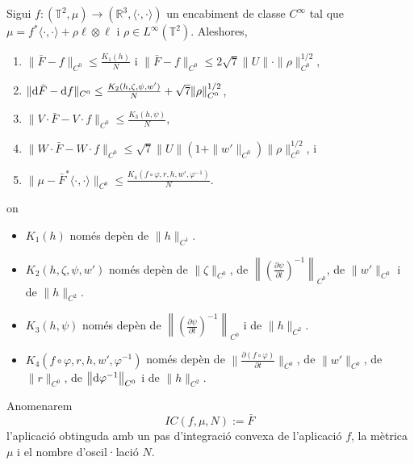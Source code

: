 \begin{teo}\label{teo:OneStep}
    Sigui $f:(\mathbb T^2, \mu)\to(\mathbb R^3, \langle\cdot, \cdot\rangle)$ un encabiment de classe $C^\infty$ tal que $\mu = f^*\langle\cdot, \cdot\rangle + \rho\ell\otimes\ell$ i $\rho\in L^\infty(\mathbb T^2)$. Aleshores, 
    \begin{enumerate}
        \item $\|\bar F-f\|_{C^0}\le\frac{K_1(h)}{N}$ i $\|\bar F-f\|_{C^0}\le 2\sqrt7\|U\|\cdot\|\rho\|^{1/2}_{C^0}$,
        \item $\|\text d\bar F-\text df\|_{C^0}\le\frac{K_2(h,\zeta,\psi,w')}{N} + \sqrt7\|\rho\|^{1/2}_{C^0}$,
        \item $\|V\cdot\bar F-V\cdot f\|_{C^0}\le\frac{K_3(h,\psi)}{N}$,
        \item $\|W\cdot\bar F-W\cdot f\|_{C^0}\le\sqrt7\|U\|(1+\|w'\|_{C^0})\|\rho\|^{1/2}_{C^0}$, i
        \item $\|\mu - \bar F^*\langle\cdot, \cdot\rangle\|_{C^0}\le\frac{K_4(f\circ\varphi,r,h,w',\varphi^{-1})}{N}$.
    \end{enumerate}
    on 
    \begin{itemize}
        \item $K_1(h)$ només depèn de $\|h\|_{C^1}$.
        \item $K_2(h,\zeta,\psi,w')$ només depèn de $\|\zeta\|_{C^0}$, de $\left\|\left(  \frac{\partial\psi}{\partial t}\right)^{-1}\right\|_{C^0}$, de $\|w'\|_{C^0}$ i de $\|h\|_{C^2}$.
        \item $K_3(h,\psi)$ només depèn de $\left\|\left(  \frac{\partial\psi}{\partial t}\right)^{-1}\right\|_{C^0}$ i de $\|h\|_{C^2}$.
        \item $K_4(f\circ\varphi,r,h,w',\varphi^{-1})$ només depèn de $\|\frac{\partial(f\circ\varphi)}{\partial t}\|_{C^0}$, de $\|w'\|_{C^0}$, de $\|r\|_{C^0}$, de $\left\|\text d\varphi^{-1}\right\|_{C^0}$ i de $\|h\|_{C^2}$.
    \end{itemize}
\end{teo}
\begin{nota}
    Anomenarem 
    \begin{equation*}
        IC(f,\mu,N):=\bar F
    \end{equation*}
    l'aplicació obtinguda amb un pas d'integració convexa de l'aplicació $f$, la mètrica $\mu$ i el nombre d'oscil·lació $N$.
\end{nota}

